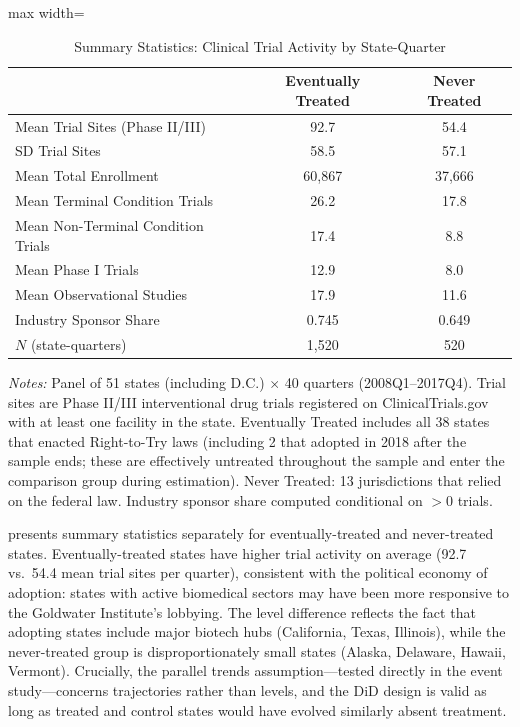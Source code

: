 \documentclass[12pt]{article}
\begin{document}
\begin{table}[H]
\centering
\caption{Summary Statistics: Clinical Trial Activity by State-Quarter}
\label{tab:summary}
\begin{adjustbox}{max width=\textwidth}
\begin{tabular}{lcc}
\toprule
 & Eventually Treated & Never Treated \\
\midrule
Mean Trial Sites (Phase II/III) & 92.7 & 54.4 \\
SD Trial Sites & 58.5 & 57.1 \\
Mean Total Enrollment & 60,867 & 37,666 \\
Mean Terminal Condition Trials & 26.2 & 17.8 \\
Mean Non-Terminal Condition Trials & 17.4 & 8.8 \\
Mean Phase I Trials & 12.9 & 8.0 \\
Mean Observational Studies & 17.9 & 11.6 \\
Industry Sponsor Share & 0.745 & 0.649 \\
$N$ (state-quarters) & 1,520 & 520 \\
\bottomrule
\end{tabular}
\end{adjustbox}
\begin{minipage}{0.95\textwidth}
\vspace{0.3em}
\footnotesize \textit{Notes:} Panel of 51 states (including D.C.) $\times$ 40 quarters (2008Q1--2017Q4). Trial sites are Phase II/III interventional drug trials registered on ClinicalTrials.gov with at least one facility in the state. Eventually Treated includes all 38 states that enacted Right-to-Try laws (including 2 that adopted in 2018 after the sample ends; these are effectively untreated throughout the sample and enter the comparison group during estimation). Never Treated: 13 jurisdictions that relied on the federal law. Industry sponsor share computed conditional on $>0$ trials.
\end{minipage}
\end{table}

 presents summary statistics separately for eventually-treated and never-treated states. Eventually-treated states have higher trial activity on average (92.7 vs.\ 54.4 mean trial sites per quarter), consistent with the political economy of adoption: states with active biomedical sectors may have been more responsive to the Goldwater Institute's lobbying. The level difference reflects the fact that adopting states include major biotech hubs (California, Texas, Illinois), while the never-treated group is disproportionately small states (Alaska, Delaware, Hawaii, Vermont). Crucially, the parallel trends assumption---tested directly in the event study---concerns trajectories rather than levels, and the DiD design is valid as long as treated and control states would have evolved similarly absent treatment.
\end{document}
